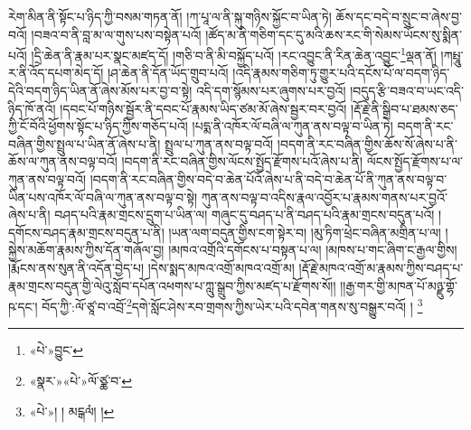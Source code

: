 རེག་མིན་ནི་སྟོང་པ་ཉིད་ཀྱི་བསམ་གཏན་ནོ། །ཀ་པཱ་ལ་ནི་སྐུ་གཉིས་སྐྱོང་བ་ཡིན་ཏེ། ཆོས་དང་བདེ་བ་སྲུང་བ་ཞེས་བྱ་བའོ། །བཟའ་བ་ནི་བླ་མ་ལ་གུས་པས་བསྟེན་པའོ། །ཚོད་མ་ནི་གཅིག་དང་དུ་མའི་ཆས་རང་གི་སེམས་ཡོངས་སུ་སྨིན་པའོ། །དྲི་ཆེན་ནི་རྣམ་པར་སྣང་མཛད་དོ། །གཅི་བ་ནི་མི་བསྐྱོད་པའོ། །རང་འབྱུང་ནི་རིན་ཆེན་འབྱུང་\footnote{«པེ་»བྱུང་}ལྡན་ནོ། །ཀཔྤཱུ་ར་ནི་འོད་དཔག་མེད་དོ། །ཤ་ཆེན་ནི་དོན་ཡོད་གྲུབ་པའོ། །འདི་རྣམས་གཅིག་ཏུ་གྱུར་པའི་དངོས་པོ་ལ་བདག་ཉིད་དེའི་བདག་ཉིད་ཡིན་ནོ་ཞེས་མོས་པར་བྱ་བ་སྟེ། འདི་དག་སྙོམས་པར་ཞུགས་པར་བྱའོ། །བདུད་རྩི་བཟའ་བ་ཡང་འདི་ཉིད་ཁོ་ནའོ། །དབང་པོ་གཉིས་སྦྱོར་ནི་དབང་པོ་རྣམས་ཡིད་ཙམ་མོ་ཞེས་སྦྱར་བར་བྱའོ། །རྡོ་རྗེ་ནི་སྒྲིབ་པ་ཐམས་ཅད་ཀྱི་ངོ་བོའི་ཕྱོགས་སྟོང་པ་ཉིད་ཀྱིས་གཅོད་པའོ། །པདྨ་ནི་འཁོར་ལོ་བཞི་ལ་ཀུན་ནས་བལྟ་བ་ཡིན་ཏེ། བདག་ནི་རང་བཞིན་གྱིས་སྤྲུལ་པ་ཡིན་ནོ་ཞེས་པ་ནི། སྤྲུལ་པ་ཀུན་ནས་བལྟ་བའོ། །བདག་ནི་རང་བཞིན་གྱིས་ཆོས་སོ་ཞེས་པ་ནི་ཆོས་ལ་ཀུན་ནས་བལྟ་བའོ། །བདག་ནི་རང་བཞིན་གྱིས་ལོངས་སྤྱོད་རྫོགས་པའོ་ཞེས་པ་ནི། ལོངས་སྤྱོད་རྫོགས་པ་ལ་ཀུན་ནས་བལྟ་བའོ། །བདག་ནི་རང་བཞིན་གྱིས་བདེ་བ་ཆེན་པོའོ་ཞེས་པ་ནི་བདེ་བ་ཆེན་པོ་ནི་ཀུན་ནས་བལྟ་བ་ཡིན་པས་འཁོར་ལོ་བཞི་ལ་ཀུན་ནས་བལྟ་བ་སྟེ། ཀུན་ནས་བལྟ་བ་འདིས་རྣལ་འབྱོར་པ་རྣམས་གནས་པར་བྱའོ་ཞེས་པ་ནི། བཤད་པའི་རྣམ་གྲངས་དྲུག་པ་ཡིན་ལ། གཞུང་དུ་བཤད་པ་ནི་བཤད་པའི་རྣམ་གྲངས་བདུན་པའོ། །དགོངས་བཤད་རྣམ་གྲངས་བདུན་པ་ནི། །ཡན་ལག་བདུན་གྱིས་ངག་སྟེར་བ། །མུ་ཏིག་ཕྲེང་བཞིན་མགྲིན་པ་ལ། །སྐྱེས་མཆོག་རྣམས་ཀྱིས་དོན་གཞོལ་བྱ། །མཁའ་འགྲོའི་དགོངས་པ་བསྟན་པ་ལ། །མཁས་པ་གང་ཞིག་ང་རྒྱལ་གྱིས། །རྨོངས་ནས་སུན་ནི་འདོན་བྱེད་པ། །དེས་སྨད་མཁའ་འགྲོ་མཁའ་འགྲོ་མ། །རྡོ་རྗེ་མཁའ་འགྲོ་མ་རྣམས་ཀྱིས་བཤད་པ་རྣམ་གྲངས་བདུན་གྱི་ལེའུ་སློབ་དཔོན་འཕགས་པ་ཀླུ་སྒྲུབ་ཀྱིས་མཛད་པ་རྫོགས་སོ།། །།རྒྱ་གར་གྱི་མཁན་པོ་མཉྫུ་གྷོ་ཥ་དང་། བོད་ཀྱི་:ལོ་ཙཱ་བ་འབྲོ་\footnote{«སྣར་»«པེ་»ལོ་ཙྪ་བ་}དགེ་སློང་ཤེས་རབ་གྲགས་ཀྱིས་ཡེར་པའི་དབེན་གནས་སུ་བསྒྱུར་བའོ། ། \footnote{«པེ་»། ། མངྒལཾ། །}